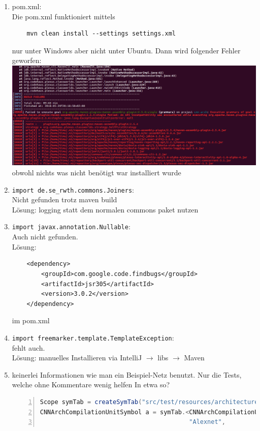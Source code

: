 \documentclass[11pt]{article}
\newcommand{\loesung}{\color{green!50!black}Lösung:\color{black}\xspace}
\begin{document}
	\begin{enumerate}
		\item pom.xml:\\
			Die pom.xml funktioniert mittels
			\begin{lstlisting}
	mvn clean install --settings settings.xml
			\end{lstlisting}
			nur unter Windows aber nicht unter Ubuntu. Dann wird folgender Fehler geworfen:
			\includegraphics[scale=0.4]{CNNArchLang-Build-Failure.PNG}
			obwohl nichts was nicht benötigt war installiert wurde
		\item \texttt{import de.se\_rwth.commons.Joiners}:\\
			Nicht gefunden trotz maven build\\
			\loesung logging statt dem normalen commons paket nutzen
		\item \texttt{import javax.annotation.Nullable}:\\
		Auch nicht gefunden. \\
			\loesung
			\begin{lstlisting}
	<dependency>
		<groupId>com.google.code.findbugs</groupId>
		<artifactId>jsr305</artifactId>
		<version>3.0.2</version>
	</dependency>
			\end{lstlisting}
			im pom.xml
		\item \texttt{import freemarker.template.TemplateException}:\\	
			fehlt auch.\\
			\loesung manuelles Installieren via IntelliJ $\rightarrow$ libs $\rightarrow$ Maven
		\item keinerlei Informationen wie man ein Beispiel-Netz benutzt. Nur die Tests, welche ohne Kommentare wenig helfen
			In etwa so?
			\begin{lstlisting}[language=java, numbers=left, basicstyle=\scriptsize]
Scope symTab = createSymTab("src/test/resources/architectures");
CNNArchCompilationUnitSymbol a = symTab.<CNNArchCompilationUnitSymbol>resolve(
                                         "Alexnet",

\end{lstlisting}
\end{enumerate}
\end{document}
